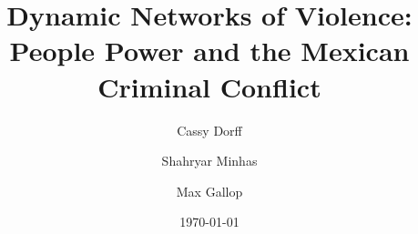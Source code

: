 \documentclass[12pt,onesided]{amsart}
\title[]{Dynamic Networks of Violence: People Power and the Mexican Criminal Conflict}
\date{\today}
\author[Dorff]{Cassy Dorff}
\author[Minhas]{Shahryar Minhas}
\author[Gallop]{Max Gallop}
\begin{document}
\maketitle

\begin{abstract}
\singlespacing

\end{abstract}

\newpage
\newpage\setcounter{page}{1} 
\doublespacing





 







% 

\newpage

%  


\end{document}

